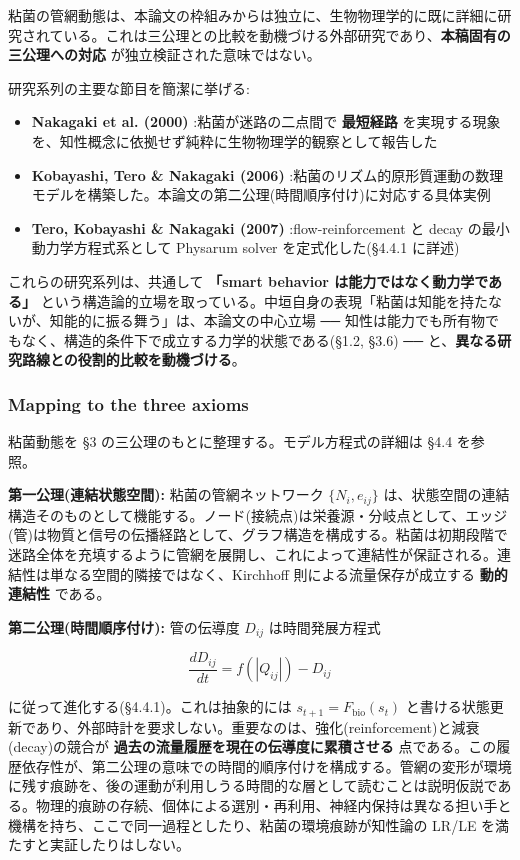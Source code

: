 粘菌の管網動態は、本論文の枠組みからは独立に、生物物理学的に既に詳細に研究されている。これは三公理との比較を動機づける外部研究であり、\textbf{本稿固有の三公理への対応} が独立検証された意味ではない。

研究系列の主要な節目を簡潔に挙げる:

\begin{itemize}
\item \textbf{Nakagaki et al. (2000)} \citep{Nakagaki2000}:粘菌が迷路の二点間で \textbf{最短経路} を実現する現象を、知性概念に依拠せず純粋に生物物理学的観察として報告した
\item \textbf{Kobayashi, Tero \& Nakagaki (2006)} \citep{Kobayashi2006}:粘菌のリズム的原形質運動の数理モデルを構築した。本論文の第二公理(時間順序付け)に対応する具体実例
\item \textbf{Tero, Kobayashi \& Nakagaki (2007)} \citep{Tero2007}:flow-reinforcement と decay の最小動力学方程式系として Physarum solver を定式化した(\S{}4.4.1 に詳述)
\end{itemize}

これらの研究系列は、共通して \textbf{「smart behavior は能力ではなく動力学である」} という構造論的立場を取っている。中垣自身の表現「粘菌は知能を持たないが、知能的に振る舞う」は、本論文の中心立場 ── 知性は能力でも所有物でもなく、構造的条件下で成立する力学的状態である(\S{}1.2, \S{}3.6) ── と、\textbf{異なる研究路線との役割的比較を動機づける}。

\subsubsection{Mapping to the three axioms}


粘菌動態を \S{}3 の三公理のもとに整理する。モデル方程式の詳細は \S{}4.4 を参照。

\textbf{第一公理(連結状態空間):}
粘菌の管網ネットワーク $\{N_i, e_{ij}\}$ は、状態空間の連結構造そのものとして機能する。ノード(接続点)は栄養源・分岐点として、エッジ(管)は物質と信号の伝播経路として、グラフ構造を構成する。粘菌は初期段階で迷路全体を充填するように管網を展開し、これによって連結性が保証される。連結性は単なる空間的隣接ではなく、Kirchhoff 則による流量保存が成立する \textbf{動的連結性} である。

\textbf{第二公理(時間順序付け):}
管の伝導度 $D_{ij}$ は時間発展方程式

\[
\frac{dD_{ij}}{dt} = f(|Q_{ij}|) - D_{ij}
\]

に従って進化する(\S{}4.4.1)。これは抽象的には $s_{t+1} = F_\text{bio}(s_t)$ と書ける状態更新であり、外部時計を要求しない。重要なのは、強化(reinforcement)と減衰(decay)の競合が \textbf{過去の流量履歴を現在の伝導度に累積させる} 点である。この履歴依存性が、第二公理の意味での時間的順序付けを構成する。管網の変形が環境に残す痕跡を、後の運動が利用しうる時間的な層として読むことは説明仮説である。物理的痕跡の存続、個体による選別・再利用、神経内保持は異なる担い手と機構を持ち、ここで同一過程としたり、粘菌の環境痕跡が知性論の LR/LE を満たすと実証したりはしない。

